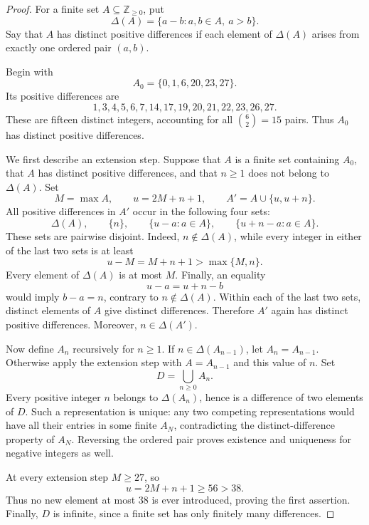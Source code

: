 \documentclass[11pt]{article}
\newcommand{\ZZ}{\mathbb{Z}}
\begin{document}
\begin{proof}
For a finite set \(A\subseteq\ZZ_{\geq 0}\), put
\[
    \Delta(A)=\{a-b:a,b\in A,\ a>b\}.
\]
Say that \(A\) has distinct positive differences if each element of
\(\Delta(A)\) arises from exactly one ordered pair \((a,b)\).

Begin with
\[
    A_0=\{0,1,6,20,23,27\}.
\]
Its positive differences are
\[
    1,3,4,5,6,7,14,17,19,20,21,22,23,26,27.
\]
These are fifteen distinct integers, accounting for all
\(\binom{6}{2}=15\) pairs. Thus \(A_0\) has distinct positive differences.

We first describe an extension step. Suppose that \(A\) is a finite set
containing \(A_0\), that \(A\) has distinct positive differences, and that
\(n\geq 1\) does not belong to \(\Delta(A)\). Set
\[
    M=\max A,\qquad u=2M+n+1,
    \qquad A'=A\cup\{u,u+n\}.
\]
All positive differences in \(A'\) occur in the following four sets:
\[
    \Delta(A),\qquad
    \{n\},\qquad
    \{u-a:a\in A\},\qquad
    \{u+n-a:a\in A\}.
\]
These sets are pairwise disjoint. Indeed, \(n\notin\Delta(A)\), while every
integer in either of the last two sets is at least
\[
    u-M=M+n+1>\max\{M,n\}.
\]
Every element of \(\Delta(A)\) is at most \(M\). Finally, an equality
\[
    u-a=u+n-b
\]
would imply \(b-a=n\), contrary to \(n\notin\Delta(A)\).
Within each of the last two sets, distinct elements of \(A\) give distinct
differences. Therefore \(A'\) again has distinct positive differences.
Moreover, \(n\in\Delta(A')\).

Now define \(A_n\) recursively for \(n\geq 1\). If
\(n\in\Delta(A_{n-1})\), let \(A_n=A_{n-1}\). Otherwise apply the extension
step with \(A=A_{n-1}\) and this value of \(n\). Set
\[
    D=\bigcup_{n\geq 0}A_n.
\]
Every positive integer \(n\) belongs to \(\Delta(A_n)\), hence is a
difference of two elements of \(D\). Such a representation is unique:
any two competing representations would have all their entries in some
finite \(A_N\), contradicting the distinct-difference property of \(A_N\).
Reversing the ordered pair proves existence and uniqueness for negative
integers as well.

At every extension step \(M\geq 27\), so
\[
    u=2M+n+1\geq 56>38.
\]
Thus no new element at most \(38\) is ever introduced, proving the first
assertion. Finally, \(D\) is infinite, since a finite set has only finitely
many differences.
\end{proof}
\end{document}
